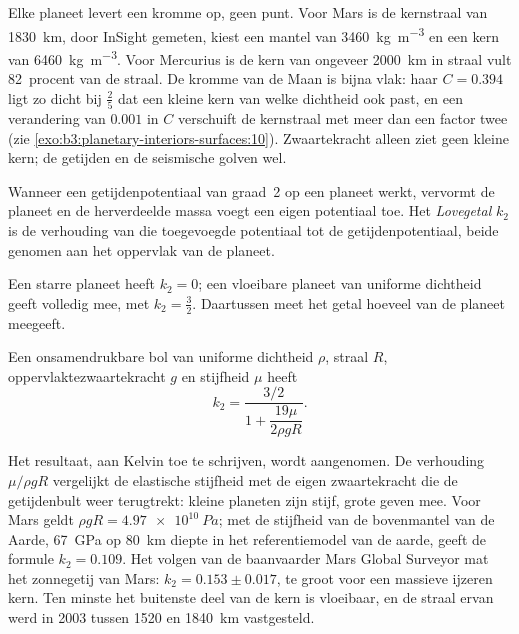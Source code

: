 Elke planeet levert een kromme op, geen punt. Voor Mars is de kernstraal van
\qty{1830}{km}, door InSight gemeten, kiest een mantel van \qty{3460}{kg.m^{-3}}
en een kern van \qty{6460}{kg.m^{-3}}. Voor Mercurius is de kern van ongeveer
\qty{2000}{km} in straal vult 82~procent van de straal. De kromme van de Maan is
bijna vlak: haar $C = 0.394$ ligt zo dicht bij $\tfrac25$ dat een kleine kern
van welke dichtheid ook past, en een verandering van $0.001$ in $C$ verschuift de kernstraal
met meer dan een factor twee (zie \cref{exo:b3:planetary-interiors-surfaces:10}).
Zwaartekracht alleen ziet geen kleine kern; de getijden en de seismische golven wel.

\begin{definition}[Lovegetal]\label{def:b3:planetary-interiors-surfaces:love-number}
Wanneer een getijdenpotentiaal van graad~2 op een planeet werkt, vervormt de planeet en
de herverdeelde massa voegt een eigen potentiaal toe. Het
\emph{Lovegetal} $k_2$ is de verhouding van die toegevoegde potentiaal tot de
getijdenpotentiaal, beide genomen aan het oppervlak van de planeet.
\end{definition}

Een starre planeet heeft $k_2 = 0$; een vloeibare planeet van uniforme dichtheid geeft
volledig mee, met $k_2 = \tfrac32$. Daartussen meet het getal hoeveel van de
planeet meegeeft.

\begin{proposition}\label{prop:b3:planetary-interiors-surfaces:kelvin}
Een onsamendrukbare bol van uniforme dichtheid $\rho$, straal $R$, oppervlaktezwaartekracht
$g$ en stijfheid $\mu$ heeft
\[
  k_2 = \frac{3/2}{1 + \dfrac{19\mu}{2\rho g R}} .
\]
\end{proposition}

Het resultaat, aan Kelvin toe te schrijven, wordt aangenomen. De verhouding $\mu/\rho gR$ vergelijkt
de elastische stijfheid met de eigen zwaartekracht die de getijdenbult weer terugtrekt:
kleine planeten zijn stijf, grote geven mee. Voor Mars geldt $\rho gR =
\qty{4.97e10}{Pa}$; met de stijfheid van de bovenmantel van de Aarde,
\qty{67}{GPa} op \qty{80}{km} diepte in het referentiemodel van de aarde, geeft de
formule $k_2 = 0.109$. Het volgen van de baanvaarder Mars Global Surveyor
mat het zonnegetij van Mars: $k_2 = 0.153 \pm 0.017$, te groot
voor een massieve ijzeren kern. Ten minste het buitenste deel van de kern is
vloeibaar, en de straal ervan werd in 2003 tussen 1520 en \qty{1840}{km} vastgesteld.

